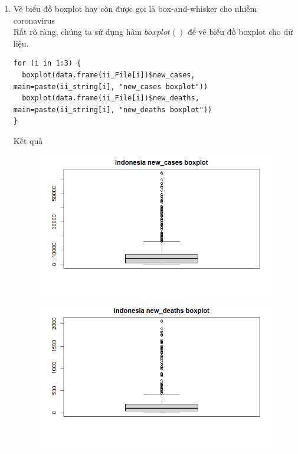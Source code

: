 \documentclass[a4paper]{article}
\theoremstyle{definition}
\begin{document}
\begin{enumerate}[1)]
\item Vẽ biểu đồ boxplot hay còn được gọi là box-and-whisker cho nhiễm coronavirus \\
Rất rõ ràng, chúng ta sử dụng hàm $boxplot()$ để vẽ biểu đồ boxplot cho dữ liệu.

\begin{lstlisting}
for (i in 1:3) {
  boxplot(data.frame(ii_File[i])$new_cases, main=paste(ii_string[i], "new_cases boxplot"))
  boxplot(data.frame(ii_File[i])$new_deaths, main=paste(ii_string[i], "new_deaths boxplot"))
}
\end{lstlisting}

    Kết quả
    \begin{figure}[H]
        \begin{center}
            \includegraphics[scale=0.4]{ii/indo box cases.png}
            \includegraphics[scale=0.4]{ii/indo box deaths.png}
        \end{center}
    \end{figure}
    \begin{figure}[H]

\end{figure}
\end{enumerate}
\end{document}
